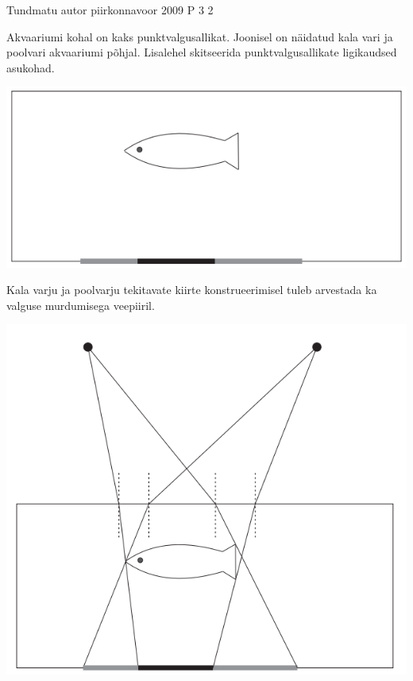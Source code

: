 {Tundmatu autor} %
{piirkonnavoor} %
{2009} %
{P 3} %
{2} %
{
\ifStatement
Akvaariumi kohal on kaks punktvalgusallikat. Joonisel on näidatud kala vari ja poolvari akvaariumi põhjal. Lisalehel skitseerida punktvalgusallikate ligikaudsed asukohad.
\begin{center}
	\includegraphics[width=0.5\linewidth]{2009-v2p-03-yl.PNG}
\end{center}
\fi

\ifHint
Kala varju ja poolvarju tekitavate kiirte konstrueerimisel tuleb arvestada ka valguse murdumisega veepiiril.
\fi

\ifSolution
\begin{center}
	\includegraphics[width=0.5\linewidth]{2009-v2p-03-lah.PNG}
\end{center}
\fi
}
